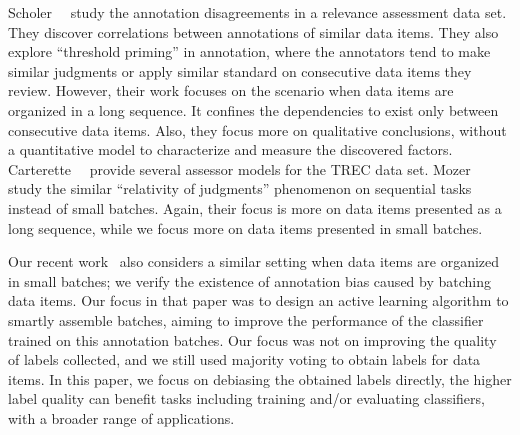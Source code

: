 

Scholer~\etal~\cite{scholer:sigir2013,scholer:sigir2011} study the annotation disagreements in 
a relevance assessment data set.  
They discover correlations between annotations of similar data items.  %
They also explore ``threshold priming'' in annotation, 
where the annotators tend to make similar judgments or apply similar standard on consecutive data items they review. 
However, their work focuses on the scenario when data items are organized in a long sequence.  
It confines the dependencies to exist only between consecutive data items.  
Also, they focus more on qualitative conclusions, without a quantitative model to characterize and measure the discovered factors.  
Carterette~\etal~\cite{carterette:effect2010} provide several assessor models for the TREC data set.  
Mozer~\etal~\cite{mozer:nips2010} study the similar ``relativity of
judgments'' phenomenon on sequential tasks instead of small batches.  
Again, their focus is more on data items presented as a long sequence, while we focus more on data items presented in small batches.  

Our recent work~\cite{zhuang:wsdm2015} also considers a similar setting when data items are organized in small batches; we verify the existence of annotation bias caused by batching data items.  
Our focus in that paper was to design an active learning algorithm to smartly assemble batches, 
aiming to improve the performance of the classifier trained on this annotation batches.  
Our focus was not on improving the quality of labels collected, 
and we still used majority voting to obtain labels for data items.  
In this paper, we focus on debiasing the obtained labels directly,
the higher label quality can benefit tasks including training and/or evaluating classifiers, 
with a broader range of applications.

